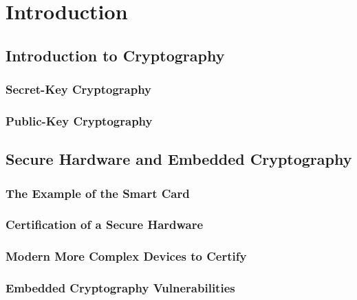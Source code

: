 
\chapter{Introduction} %

\label{ChapterIntroduction}


\section{Introduction to Cryptography}
\subsection{Secret-Key Cryptography}
\subsection{Public-Key Cryptography}


\section{Secure Hardware and Embedded Cryptography}
\subsection{The Example of the Smart Card}
\subsection{Certification of a Secure Hardware}
\subsection{Modern More Complex Devices to Certify}
\subsection{Embedded Cryptography Vulnerabilities}

